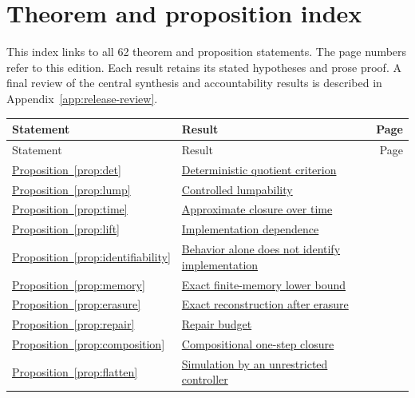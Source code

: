 \clearpage
\section{Theorem and proposition index}\label{app:statement-index}
This index links to all 62 theorem and proposition statements. The page numbers refer to this edition. Each result retains its stated hypotheses and prose proof. A final review of the central synthesis and accountability results is described in Appendix~\ref{app:release-review}.
\begingroup\small\setlength{\tabcolsep}{4pt}\renewcommand{\arraystretch}{1.15}
\begin{longtable}{@{}P{.19\linewidth}P{.69\linewidth}r@{}}
\toprule Statement & Result & Page\\\midrule\endfirsthead
\toprule Statement & Result & Page\\\midrule\endhead
\bottomrule\endfoot
\hyperref[prop:det]{Proposition~\ref*{prop:det}} & \hyperref[prop:det]{Deterministic quotient criterion} & \pageref{prop:det}\\
\hyperref[prop:lump]{Proposition~\ref*{prop:lump}} & \hyperref[prop:lump]{Controlled lumpability} & \pageref{prop:lump}\\
\hyperref[prop:time]{Proposition~\ref*{prop:time}} & \hyperref[prop:time]{Approximate closure over time} & \pageref{prop:time}\\
\hyperref[prop:lift]{Proposition~\ref*{prop:lift}} & \hyperref[prop:lift]{Implementation dependence} & \pageref{prop:lift}\\
\hyperref[prop:identifiability]{Proposition~\ref*{prop:identifiability}} & \hyperref[prop:identifiability]{Behavior alone does not identify implementation} & \pageref{prop:identifiability}\\
\hyperref[prop:memory]{Proposition~\ref*{prop:memory}} & \hyperref[prop:memory]{Exact finite-memory lower bound} & \pageref{prop:memory}\\
\hyperref[prop:erasure]{Proposition~\ref*{prop:erasure}} & \hyperref[prop:erasure]{Exact reconstruction after erasure} & \pageref{prop:erasure}\\
\hyperref[prop:repair]{Proposition~\ref*{prop:repair}} & \hyperref[prop:repair]{Repair budget} & \pageref{prop:repair}\\
\hyperref[prop:composition]{Proposition~\ref*{prop:composition}} & \hyperref[prop:composition]{Compositional one-step closure} & \pageref{prop:composition}\\
\hyperref[prop:flatten]{Proposition~\ref*{prop:flatten}} & \hyperref[prop:flatten]{Simulation by an unrestricted controller} & \pageref{prop:flatten}\\

\end{longtable}
